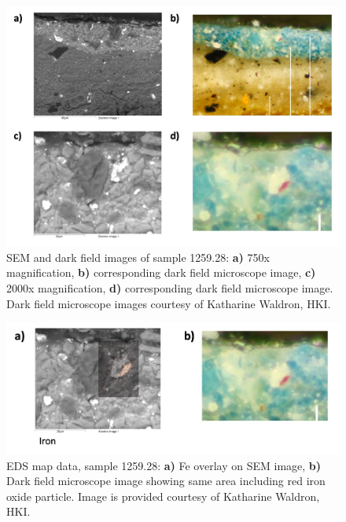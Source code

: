 \begin{figure}[H]
  \centering
  \includegraphics[width=\linewidth]{1259-28_imgs}
\caption[SEM and dark field images of sample 1259.28.]{SEM and dark field images of sample 1259.28: \textbf{a)} 750x magnification, \textbf{b)} corresponding dark field microscope image, \textbf{c)} 2000x magnification, \textbf{d)} corresponding dark field microscope image. Dark field microscope images courtesy of Katharine Waldron, HKI.}
\label{fig:1259.28_imgs}
\end{figure}

\begin{figure}[H]
  \centering
  \includegraphics[width=\linewidth]{1259-28_map_iron}
\caption[EDS map data, sample 1259.28.]{EDS map data, sample 1259.28: \textbf{a)} Fe overlay on SEM image, \textbf{b)} Dark field microscope image showing same area including red iron oxide particle. Image is provided courtesy of Katharine Waldron, HKI.}
\label{fig:1259.28_map_iron}
\end{figure}


